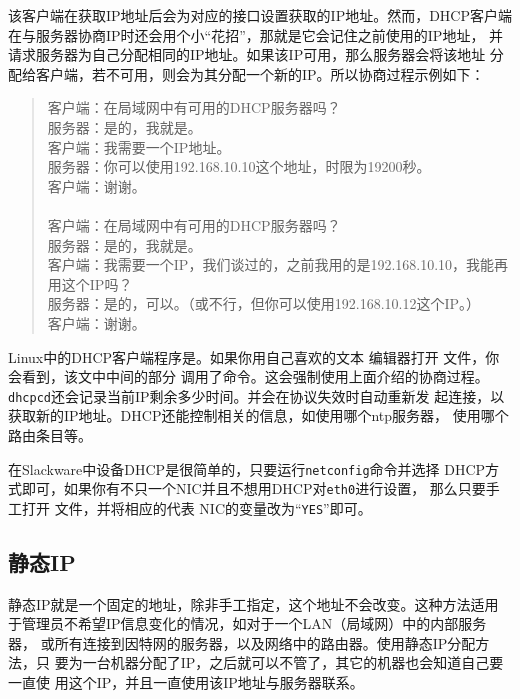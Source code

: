 该客户端在获取IP地址后会为对应的接口设置获取的IP地址。然而，DHCP客户端
在与服务器协商IP时还会用个小``花招''，那就是它会记住之前使用的IP地址，
并请求服务器为自己分配相同的IP地址。如果该IP可用，那么服务器会将该地址
分配给客户端，若不可用，则会为其分配一个新的IP。所以协商过程示例如下：

\begin{quote}
  客户端：在局域网中有可用的DHCP服务器吗？\\
  服务器：是的，我就是。\\
  客户端：我需要一个IP地址。\\
  服务器：你可以使用192.168.10.10这个地址，时限为19200秒。\\
  客户端：谢谢。\\
  \\
  客户端：在局域网中有可用的DHCP服务器吗？\\
  服务器：是的，我就是。\\
  客户端：我需要一个IP，我们谈过的，之前我用的是192.168.10.10，我能再
  用这个IP吗？\\
  服务器：是的，可以。（或不行，但你可以使用192.168.10.12这个IP。）\\
  客户端：谢谢。\\
\end{quote}

Linux中的DHCP客户端程序是。如果你用自己喜欢的文本
编辑器打开  文件，你会看到，该文中中间的部分
调用了命令。这会强制使用上面介绍的协商过程。
\texttt{dhcpcd}还会记录当前IP剩余多少时间。并会在协议失效时自动重新发
起连接，以获取新的IP地址。DHCP还能控制相关的信息，如使用哪个ntp服务器，
使用哪个路由条目等。

在Slackware中设备DHCP是很简单的，只要运行\texttt{netconfig}命令并选择
DHCP方式即可，如果你有不只一个NIC并且不想用DHCP对\texttt{eth0}进行设置，
那么只要手工打开 文件，并将相应的代表
NIC的变量改为``\texttt{YES}''即可。


\subsection{静态IP}
\label{sec:networkConfiguration:tcpIP:staticIP}
静态IP就是一个固定的地址，除非手工指定，这个地址不会改变。这种方法适用
于管理员不希望IP信息变化的情况，如对于一个LAN（局域网）中的内部服务器，
或所有连接到因特网的服务器，以及网络中的路由器。使用静态IP分配方法，只
要为一台机器分配了IP，之后就可以不管了，其它的机器也会知道自己要一直使
用这个IP，并且一直使用该IP地址与服务器联系。

